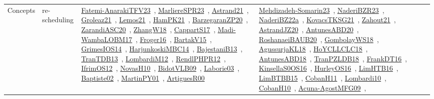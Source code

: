 {\begin{longtable}{lp{3cm}>{\raggedright\arraybackslash}p{6cm}>{\raggedright\arraybackslash}p{6cm}>{\raggedright\arraybackslash}p{8cm}}
Concepts & re-scheduling & \href{../works/Fatemi-AnarakiTFV23.pdf}{Fatemi-AnarakiTFV23}~\cite{Fatemi-AnarakiTFV23}, \href{../works/MarliereSPR23.pdf}{MarliereSPR23}~\cite{MarliereSPR23}, \href{../works/Astrand21.pdf}{Astrand21}~\cite{Astrand21}, \href{../works/Groleaz21.pdf}{Groleaz21}~\cite{Groleaz21}, \href{../works/Lemos21.pdf}{Lemos21}~\cite{Lemos21}, \href{../works/HamPK21.pdf}{HamPK21}~\cite{HamPK21}, \href{../works/BarzegaranZP20.pdf}{BarzegaranZP20}~\cite{BarzegaranZP20}, \href{../works/ZarandiASC20.pdf}{ZarandiASC20}~\cite{ZarandiASC20}, \href{../works/ZhangW18.pdf}{ZhangW18}~\cite{ZhangW18}, \href{../works/CappartS17.pdf}{CappartS17}~\cite{CappartS17}, \href{../works/Madi-WambaLOBM17.pdf}{Madi-WambaLOBM17}~\cite{Madi-WambaLOBM17}, \href{../works/Froger16.pdf}{Froger16}~\cite{Froger16}, \href{../works/BartakV15.pdf}{BartakV15}~\cite{BartakV15}, \href{../works/GrimesIOS14.pdf}{GrimesIOS14}~\cite{GrimesIOS14}, \href{../works/HarjunkoskiMBC14.pdf}{HarjunkoskiMBC14}~\cite{HarjunkoskiMBC14}, \href{../works/BajestaniB13.pdf}{BajestaniB13}~\cite{BajestaniB13}, \href{../works/TranTDB13.pdf}{TranTDB13}~\cite{TranTDB13}, \href{../works/LombardiM12.pdf}{LombardiM12}~\cite{LombardiM12}, \href{../works/RendlPHPR12.pdf}{RendlPHPR12}~\cite{RendlPHPR12}, \href{../works/IfrimOS12.pdf}{IfrimOS12}~\cite{IfrimOS12}, \href{../works/NovasH10.pdf}{NovasH10}~\cite{NovasH10}, \href{../works/BidotVLB09.pdf}{BidotVLB09}~\cite{BidotVLB09}, \href{../works/Laborie03.pdf}{Laborie03}~\cite{Laborie03}, \href{../works/Baptiste02.pdf}{Baptiste02}~\cite{Baptiste02}, \href{../works/MartinPY01.pdf}{MartinPY01}~\cite{MartinPY01}, \href{../works/ArtiguesR00.pdf}{ArtiguesR00}~\cite{ArtiguesR00} & \href{../works/Mehdizadeh-Somarin23.pdf}{Mehdizadeh-Somarin23}~\cite{Mehdizadeh-Somarin23}, \href{../works/NaderiBZR23.pdf}{NaderiBZR23}~\cite{NaderiBZR23}, \href{../works/NaderiBZ22a.pdf}{NaderiBZ22a}~\cite{NaderiBZ22a}, \href{../works/KovacsTKSG21.pdf}{KovacsTKSG21}~\cite{KovacsTKSG21}, \href{../works/Zahout21.pdf}{Zahout21}~\cite{Zahout21}, \href{../works/AstrandJZ20.pdf}{AstrandJZ20}~\cite{AstrandJZ20}, \href{../works/AntunesABD20.pdf}{AntunesABD20}~\cite{AntunesABD20}, \href{../works/RoshanaeiBAUB20.pdf}{RoshanaeiBAUB20}~\cite{RoshanaeiBAUB20}, \href{../works/GombolayWS18.pdf}{GombolayWS18}~\cite{GombolayWS18}, \href{../works/AgussurjaKL18.pdf}{AgussurjaKL18}~\cite{AgussurjaKL18}, \href{../works/HoYCLLCLC18.pdf}{HoYCLLCLC18}~\cite{HoYCLLCLC18}, \href{../works/AntunesABD18.pdf}{AntunesABD18}~\cite{AntunesABD18}, \href{../works/TranPZLDB18.pdf}{TranPZLDB18}~\cite{TranPZLDB18}, \href{../works/FrankDT16.pdf}{FrankDT16}~\cite{FrankDT16}, \href{../works/KinsellaS0OS16.pdf}{KinsellaS0OS16}~\cite{KinsellaS0OS16}, \href{../works/HurleyOS16.pdf}{HurleyOS16}~\cite{HurleyOS16}, \href{../works/LimHTB16.pdf}{LimHTB16}~\cite{LimHTB16}, \href{../works/LimBTBB15.pdf}{LimBTBB15}~\cite{LimBTBB15}, \href{../works/CobanH11.pdf}{CobanH11}~\cite{CobanH11}, \href{../works/Lombardi10.pdf}{Lombardi10}~\cite{Lombardi10}, \href{../works/CobanH10.pdf}{CobanH10}~\cite{CobanH10}, \href{../works/Acuna-AgostMFG09.pdf}{Acuna-AgostMFG09}~\cite{Acuna-AgostMFG09}, 
\end{longtable}}
